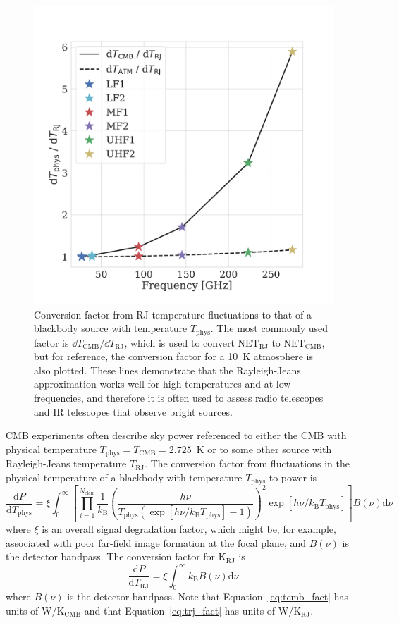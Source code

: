\begin{figure}[!t]
    \centering
    \includegraphics[width=0.6\linewidth, trim=1cm 1cm 1cm 3.5cm, clip]{SensitivityCalculation/Figures/dTcmb_dTrj_conversion.pdf}
    \caption{Conversion factor from RJ temperature fluctuations to that of a blackbody source with temperature $T_{\mathrm{phys}}$. The most commonly used factor is $\dd T_{\mathrm{CMB}} / \dd T_{\mathrm{RJ}}$, which is used to convert $\mathrm{NET_{RJ}}$ to $\mathrm{NET_{CMB}}$, but for reference, the conversion factor for a 10~K atmosphere is also plotted. These lines demonstrate that the Rayleigh-Jeans approximation works well for high temperatures and at low frequencies, and therefore it is often used to assess radio telescopes and IR telescopes that observe bright sources.}
    \label{fig:dTcmb_dTrj}
\end{figure}

CMB experiments often describe sky power referenced to either the CMB with physical temperature $T_{\mathrm{phys}} = T_{\mathrm{CMB}} = 2.725$~K or to some other source with Rayleigh-Jeans temperature $T_{\mathrm{RJ}}$. The conversion factor from fluctuations in the physical temperature of a blackbody with temperature $T_{\mathrm{phys}}$ to power is
\begin{equation}
    \frac{\mathrm{d} P}{\mathrm{d} T_{\mathrm{phys}}} = \xi \int_{0}^{\infty} \left[ \prod_{i=1}^{N_{\mathrm{elem}}} \frac{1}{k_{\mathrm{B}}} \left(  \frac{h \nu}{T_{\mathrm{phys}} \left( \exp \left[ h \nu / k_{\mathrm{B}} T_{\mathrm{phys}} \right] - 1 \right) } \right)^{2} \exp \left[h \nu / k_{\mathrm{B}} T_{\mathrm{phys}} \right] \right] B(\nu) \mathrm{d} \nu
    \label{eq:tcmb_fact}
\end{equation}
where $\xi$ is an overall signal degradation factor, which might be, for example, associated with poor far-field image formation at the focal plane, and $B(\nu)$ is the detector bandpass. The conversion factor for $\mathrm{K_{RJ}}$ is
\begin{equation}
    \frac{\mathrm{d} P}{\mathrm{d} T_{\mathrm{RJ}}} = \xi \int_{0}^{\infty} k_{\mathrm{B}} B(\nu) \mathrm{d} \nu
    \label{eq:trj_fact}
\end{equation}
where $B(\nu)$ is the detector bandpass. Note that Equation~\ref{eq:tcmb_fact} has units of $\mathrm{W / K_{CMB}}$ and that Equation~\ref{eq:trj_fact} has units of $\mathrm{W / K_{RJ}}$.

